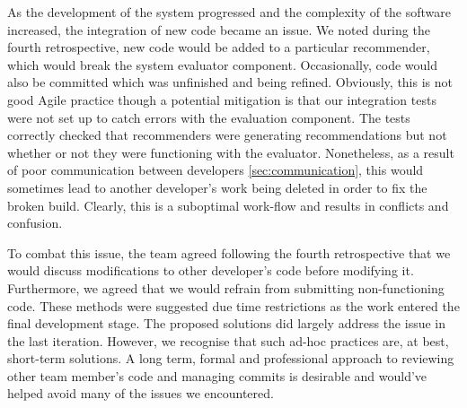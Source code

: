 \documentclass{l3proj}
\begin{document}
As the development of the system progressed and the complexity of the software increased, the integration of new code became an issue. We noted during the fourth retrospective, new code would be added to a particular recommender, which would break the system evaluator component. Occasionally, code would also be committed which was unfinished and being refined. Obviously, this is not good Agile practice though a potential mitigation is that our integration tests were not set up to catch errors with the evaluation component. The tests correctly checked that recommenders were generating recommendations but not whether or not they were functioning with the evaluator. Nonetheless, as a result of poor communication between developers \ref{sec:communication}, this would sometimes lead to another developer's work being deleted in order to fix the broken build. Clearly, this is a suboptimal work-flow and results in conflicts and confusion. 

To combat this issue, the team agreed following the fourth retrospective that we would discuss modifications to other developer's code before modifying it. Furthermore, we agreed that we would refrain from submitting non-functioning code. These methods were suggested due time restrictions as the work entered the final development stage. The proposed solutions did largely address the issue in the last iteration. However, we recognise that such ad-hoc practices are, at best, short-term solutions. A long term, formal and professional approach to reviewing other team member's code and managing commits is desirable and would've helped avoid many of the issues we encountered.
\end{document}
